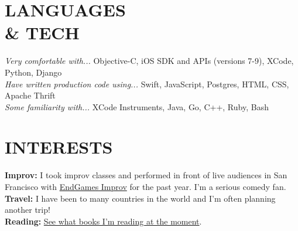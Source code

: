 \documentclass[margin, 10pt]{res} %
\begin{document}
\begin{resume}

\section{LANGUAGES \\ \& TECH }
{\sl Very comfortable with...} Objective-C, iOS SDK and APIs (versions 7-9), XCode, Python, Django \\
{\sl Have written production code using...} Swift, JavaScript, Postgres, HTML, CSS, Apache Thrift \\
{\sl Some familiarity with...} XCode Instruments, Java, Go, C++, Ruby, Bash


\section{INTERESTS}
{\bf Improv:} I took improv classes and performed in front of live audiences in San Francisco with \href{http://endgamesimprov.com/}{EndGames Improv} for the past year. I'm a serious comedy fan. \\
{\bf Travel:} I have been to many countries in the world and I'm often planning another trip! \\
{\bf Reading:} \href{http://www.goodreads.com/user/show/55900995-sean-mcqueen}{See what books I'm reading at the moment}. \\


\end{resume}
\end{document}
